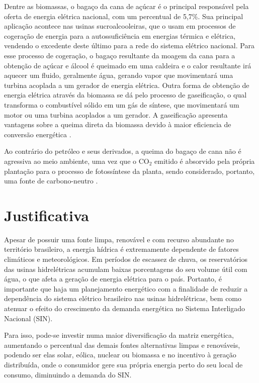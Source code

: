 Dentre as biomassas, o bagaço da cana de açúcar é o principal responsável pela oferta de energia elétrica nacional, com um percentual de 5,7\%. Sua principal aplicação acontece nas usinas sucroalcooleiras, que o usam em processos de cogeração de energia para a autossuficiência em energias térmica e elétrica, vendendo o excedente deste último para a rede do sistema elétrico nacional. Para esse processo de cogeração, o bagaço resultante da moagem da cana para a obtenção de açúcar e álcool é queimado em uma caldeira e o calor resultante irá aquecer um fluido, geralmente água, gerando vapor que movimentará uma turbina acoplada a um gerador de energia elétrica. Outra forma de obtenção de energia elétrica através da biomassa se dá pelo processo de gaseificação, o qual transforma o combustível sólido em um gás de síntese, que movimentará um motor ou uma turbina acoplados a um gerador. A gaseificação apresenta vantagens sobre a queima direta da biomassa devido à maior eficiencia de conversão energética \cite{chaves2016}. 

Ao contrário do petróleo e seus derivados, a queima do bagaço de cana não é agressiva ao meio ambiente, uma vez que o CO$_2$ emitido é absorvido pela própria plantação para o processo de fotossíntese da planta, sendo considerado, portanto, uma fonte de carbono-neutro \cite{basu2010}.

\section{Justificativa}

Apesar de possuir uma fonte limpa, renovável e com recurso abundante no território brasileiro, a energia hídrica é extremamente dependente de fatores climáticos e meteorológicos. Em períodos de escassez de chuva, os reservatórios das usinas hidrelétricas acumulam baixas porcentagens do seu volume útil com água, o que afeta a geração de energia elétrica para o país. Portanto, é importante que haja um planejamento energético com a finalidade de reduzir a dependência do sistema elétrico brasileiro nas usinas hidrelétricas, bem como atenuar o efeito do crescimento da demanda energética no Sistema Interligado Nacional (SIN). 

Para isso, pode-se investir numa maior diversificação da matriz energética, aumentando o percentual das demais fontes alternativas limpas e renováveis, podendo ser elas solar, eólica, nuclear ou biomassa e no incentivo à geração distribuída, onde o consumidor gere sua própria energia perto do seu local de consumo, diminuindo a demanda do SIN. 

